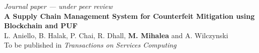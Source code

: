 
\bigskip
{}%
\emph{Journal paper --- under peer review}\\
\textbf{A Supply Chain Management System for Counterfeit Mitigation using Blockchain and PUF}\\
L. Aniello, B. Halak, P. Chai, R. Dhall, \textbf{M. Mihalea} and A. Wilczynski\\
To be published in \emph{Transactions on Services Computing}
